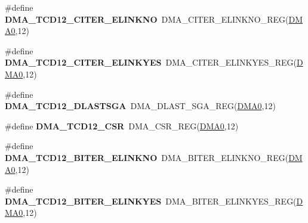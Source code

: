 \begin{DoxyCompactItemize}
\item 
\#define {\bfseries D\+M\+A\+\_\+\+T\+C\+D12\+\_\+\+C\+I\+T\+E\+R\+\_\+\+E\+L\+I\+N\+K\+NO}~D\+M\+A\+\_\+\+C\+I\+T\+E\+R\+\_\+\+E\+L\+I\+N\+K\+N\+O\+\_\+\+R\+EG(\hyperlink{group__DMA__Peripheral__Access__Layer_ga4103044f9ca209772f513dc694513ffb}{D\+M\+A0},12)\hypertarget{group__DMA__Register__Accessor__Macros_ga4fbff5cf590769e3d1046d61c9374be2}{}\label{group__DMA__Register__Accessor__Macros_ga4fbff5cf590769e3d1046d61c9374be2}

\item 
\#define {\bfseries D\+M\+A\+\_\+\+T\+C\+D12\+\_\+\+C\+I\+T\+E\+R\+\_\+\+E\+L\+I\+N\+K\+Y\+ES}~D\+M\+A\+\_\+\+C\+I\+T\+E\+R\+\_\+\+E\+L\+I\+N\+K\+Y\+E\+S\+\_\+\+R\+EG(\hyperlink{group__DMA__Peripheral__Access__Layer_ga4103044f9ca209772f513dc694513ffb}{D\+M\+A0},12)\hypertarget{group__DMA__Register__Accessor__Macros_ga290c8f3a36c751db0532836878131db6}{}\label{group__DMA__Register__Accessor__Macros_ga290c8f3a36c751db0532836878131db6}

\item 
\#define {\bfseries D\+M\+A\+\_\+\+T\+C\+D12\+\_\+\+D\+L\+A\+S\+T\+S\+GA}~D\+M\+A\+\_\+\+D\+L\+A\+S\+T\+\_\+\+S\+G\+A\+\_\+\+R\+EG(\hyperlink{group__DMA__Peripheral__Access__Layer_ga4103044f9ca209772f513dc694513ffb}{D\+M\+A0},12)\hypertarget{group__DMA__Register__Accessor__Macros_ga1c61d3ecf389551728ac8271b2e53486}{}\label{group__DMA__Register__Accessor__Macros_ga1c61d3ecf389551728ac8271b2e53486}

\item 
\#define {\bfseries D\+M\+A\+\_\+\+T\+C\+D12\+\_\+\+C\+SR}~D\+M\+A\+\_\+\+C\+S\+R\+\_\+\+R\+EG(\hyperlink{group__DMA__Peripheral__Access__Layer_ga4103044f9ca209772f513dc694513ffb}{D\+M\+A0},12)\hypertarget{group__DMA__Register__Accessor__Macros_ga20541e42162680378136b1da043ba15b}{}\label{group__DMA__Register__Accessor__Macros_ga20541e42162680378136b1da043ba15b}

\item 
\#define {\bfseries D\+M\+A\+\_\+\+T\+C\+D12\+\_\+\+B\+I\+T\+E\+R\+\_\+\+E\+L\+I\+N\+K\+NO}~D\+M\+A\+\_\+\+B\+I\+T\+E\+R\+\_\+\+E\+L\+I\+N\+K\+N\+O\+\_\+\+R\+EG(\hyperlink{group__DMA__Peripheral__Access__Layer_ga4103044f9ca209772f513dc694513ffb}{D\+M\+A0},12)\hypertarget{group__DMA__Register__Accessor__Macros_gafbb305fbbbe14b18f2425921555a875b}{}\label{group__DMA__Register__Accessor__Macros_gafbb305fbbbe14b18f2425921555a875b}

\item 
\#define {\bfseries D\+M\+A\+\_\+\+T\+C\+D12\+\_\+\+B\+I\+T\+E\+R\+\_\+\+E\+L\+I\+N\+K\+Y\+ES}~D\+M\+A\+\_\+\+B\+I\+T\+E\+R\+\_\+\+E\+L\+I\+N\+K\+Y\+E\+S\+\_\+\+R\+EG(\hyperlink{group__DMA__Peripheral__Access__Layer_ga4103044f9ca209772f513dc694513ffb}{D\+M\+A0},12)\hypertarget{group__DMA__Register__Accessor__Macros_ga2b17649d2bc48a65938316a07ce7424f}{}\label{group__DMA__Register__Accessor__Macros_ga2b17649d2bc48a65938316a07ce7424f}


\end{DoxyCompactItemize}
